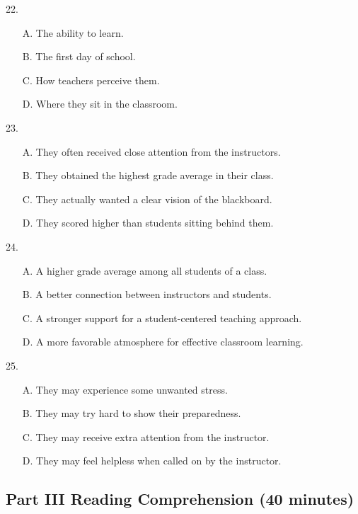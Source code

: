 \documentclass[UTF8,11pt]{ctexart}
\begin{document}
22.


\begin{itemize}[leftmargin=2em,itemsep=.2em,topsep=.4em]\item[A.] The ability to learn.
\item[B.] The first day of school.
\item[C.] How teachers perceive them.
\item[D.] Where they sit in the classroom.
\end{itemize}

23.


\begin{itemize}[leftmargin=2em,itemsep=.2em,topsep=.4em]\item[A.] They often received close attention from the instructors.
\item[B.] They obtained the highest grade average in their class.
\item[C.] They actually wanted a clear vision of the blackboard.
\item[D.] They scored higher than students sitting behind them.
\end{itemize}

24.


\begin{itemize}[leftmargin=2em,itemsep=.2em,topsep=.4em]\item[A.] A higher grade average among all students of a class.
\item[B.] A better connection between instructors and students.
\item[C.] A stronger support for a student-centered teaching approach.
\item[D.] A more favorable atmosphere for effective classroom learning.
\end{itemize}

25.


\begin{itemize}[leftmargin=2em,itemsep=.2em,topsep=.4em]\item[A.] They may experience some unwanted stress.
\item[B.] They may try hard to show their preparedness.
\item[C.] They may receive extra attention from the instructor.
\item[D.] They may feel helpless when called on by the instructor.
\end{itemize}

\subsection*{\textbf{Part III Reading Comprehension (40 minutes)}}
\end{document}
